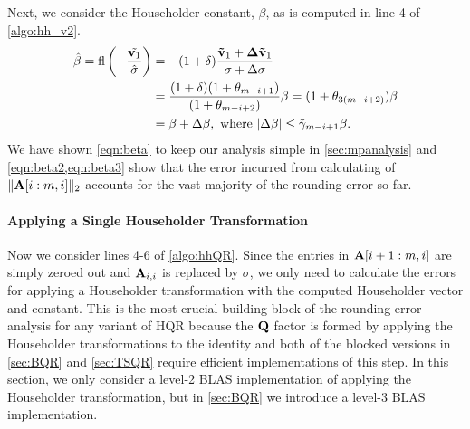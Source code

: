 Next, we consider the Householder constant, $\beta$, as is computed in line 4 of \cref{algo:hh_v2}.
\begin{align}
\hat{\beta} = \fl\left(-\frac{\tilde{\bb{v}_1}}{\hat{\sigma}}\right) &=-(1+\dd)\frac{\bb{\tilde{v}}_1+\bb{\Delta \tilde{v}}_1}{\sigma + \Delta\sigma} \label{eqn:beta}\\
&= \frac{(1+\dd)(1+\tth_{m-i+1})}{(1+\tth_{m-i+2})}\beta = (1+\tth_{3(m-i+2)})\beta \label{eqn:beta2}\\
& = \beta + \Delta \beta,\text{ where } |\Delta\beta| \leq \tilde{\gamma}_{m-i+1} \beta\label{eqn:beta3}.
\end{align}
We have shown \cref{eqn:beta} to keep our analysis simple in \cref{sec:mpanalysis} and \cref{eqn:beta2,eqn:beta3} show that the error incurred from calculating of $\|\mathbf{A}[i:m,i]\|_2$ accounts for the vast majority of the rounding error so far.
\paragraph{Applying a Single Householder Transformation}
Now we consider lines 4-6 of \cref{algo:hhQR}. 
Since the entries in $\mathbf{A}[i+1:m,i]$ are simply zeroed out and $\mathbf{A}_{i,i}$ is replaced by $\sigma$, we only need to calculate the errors for applying a Householder transformation with the computed Householder vector and constant. 
This is the most crucial building block of the rounding error analysis for any variant of HQR because the $\mathbf{Q}$ factor is formed by applying the Householder transformations to the identity and both of the blocked versions in \cref{sec:BQR} and \cref{sec:TSQR} require efficient implementations of this step. 
In this section, we only consider a level-2 BLAS implementation of applying the Householder transformation, but in \cref{sec:BQR} we introduce a level-3 BLAS implementation.\par

